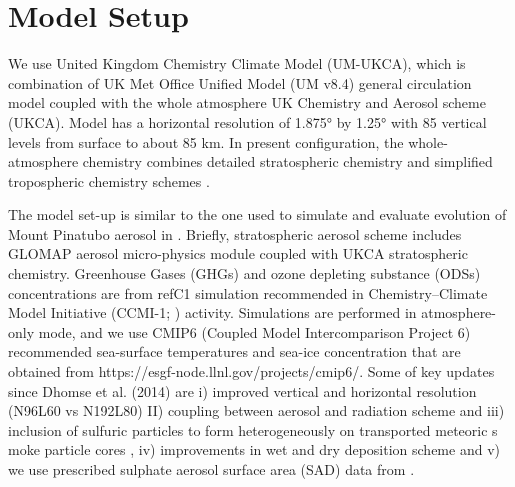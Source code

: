 \documentclass[acpd]{copernicus}
\begin{document}
\section{Model Setup}
We use United Kingdom Chemistry Climate Model (UM-UKCA), which is combination of  
UK Met Office Unified Model (UM v8.4) general circulation model coupled
with the whole atmosphere UK Chemistry and Aerosol scheme (UKCA). 
Model has a horizontal resolution of 1.875° by 1.25° with 85 vertical 
levels from surface to about 85 km. In present configuration,  
the whole-atmosphere chemistry combines detailed 
stratospheric chemistry and simplified tropospheric chemistry schemes
 \citep{Morgenstern2009, Oconnor2014}. 


The model set-up is similar to the one used to simulate and evaluate evolution of 
Mount Pinatubo aerosol in \citep{Dhomse2014}. Briefly, stratospheric aerosol
scheme includes GLOMAP aerosol micro-physics module coupled with UKCA stratospheric
 chemistry. Greenhouse Gases (GHGs) and ozone depleting substance (ODSs) 
concentrations are from refC1 simulation recommended in  
Chemistry–Climate Model Initiative (CCMI-1; \cite{Eyring2013, Morgenstern2017})
 activity. Simulations are  performed in atmosphere-only mode, and we use CMIP6 
(Coupled Model Intercomparison Project 6) recommended  sea-surface temperatures 
and sea-ice concentration that are obtained from https://esgf-node.llnl.gov/projects/cmip6/.  
Some of key updates since  Dhomse et al. (2014) are i) improved vertical and horizontal 
resolution (N96L60 vs N192L80) II) coupling between aerosol and radiation scheme \citep{Mann2015} and 
iii) inclusion of sulfuric particles to form heterogeneously on transported meteoric s
moke particle cores \citep{Brooks2017}, iv) improvements in wet and dry deposition scheme 
\citet{Marshall2018} and v) we use prescribed sulphate aerosol surface area (SAD)
 data from \cite{Arfeuille2013}. 
\end{document}
